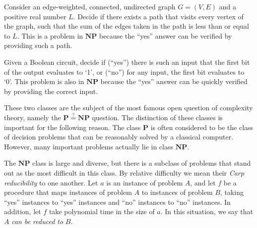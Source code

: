 
\begin{example}
    Consider an edge-weighted, connected, undirected graph $G=(V, E)$ and a positive real number $L$. Decide if there exists a path that visits every vertex of the graph, such that the sum of the edges taken in the path is less than or equal to $L$. This is a problem in $\mathbf{NP}$ because the ``yes'' answer can be verified by providing such a path.
\end{example}

\begin{example}
    Given a Boolean circuit, decide if (``yes'') there is such an input that the first bit of the output evaluates to `1', or (``no'') for any input, the first bit evaluates to `0'. This problem is also in $\mathbf{NP}$ because the ``yes'' answer can be quickly verified by providing the correct input.
\end{example}

These two classes are the subject of the most famous open question of complexity theory, namely the $\mathbf{P} \overset{?}{=} \mathbf{NP}$ question. The distinction of these classes is important for the following reason. The class $\mathbf{P}$ is often considered to be the class of decision problems that can be reasonably solved by a classical computer. However, many important problems actually lie in class $\mathbf{NP}$.

The $\mathbf{NP}$ class is large and diverse, but there is a subclass of problems that stand out as the most difficult in this class. By relative difficulty we mean their \textit{Carp reducibility} to one another. Let $a$ is an instance of problem $A$, and let $f$ be a procedure that maps instances of problem $A$ to instances of problem $B$, taking ``yes'' instances to ``yes'' instances and ``no'' instances to ``no'' instances. In addition, let $f$ take polynomial time in the size of $a$. In this situation, we say that $A$ \textit{can be reduced to} $B$. 

